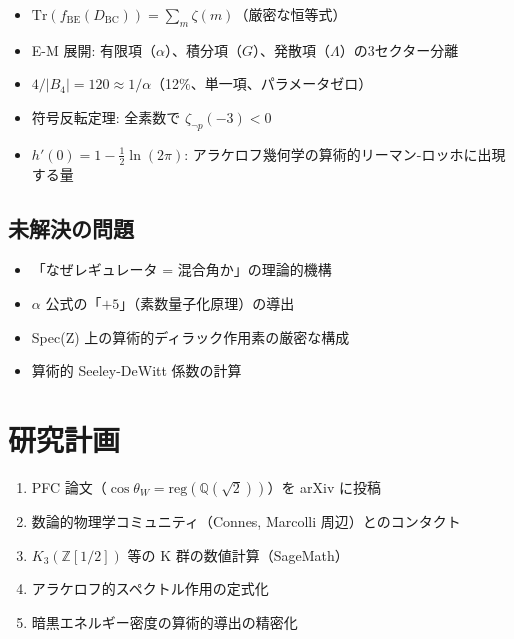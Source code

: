 \documentclass[11pt,a4paper]{article}
\begin{document}
\begin{resultbox}[確立された数学]
\begin{itemize}
\item $\mathrm{Tr}(f_{\mathrm{BE}}(D_{\mathrm{BC}})) = \sum_m \zeta(m)$（厳密な恒等式）
\item E-M 展開: 有限項（$\alpha$）、積分項（$G$）、発散項（$\Lambda$）の3セクター分離
\item $4/|B_4| = 120 \approx 1/\alpha$（12\%、単一項、パラメータゼロ）
\item 符号反転定理: 全素数で $\zeta_{\neg p}(-3) < 0$
\item $h'(0) = 1 - \frac{1}{2}\ln(2\pi)$: アラケロフ幾何学の算術的リーマン-ロッホに出現する量
\end{itemize}
\end{resultbox}

\subsection{未解決の問題}

\begin{honestbox}[開かれた問い]
\begin{itemize}
\item 「なぜレギュレータ = 混合角か」の理論的機構
\item $\alpha$ 公式の「$+5$」（素数量子化原理）の導出
\item Spec(Z) 上の算術的ディラック作用素の厳密な構成
\item 算術的 Seeley-DeWitt 係数の計算
\end{itemize}
\end{honestbox}

\section{研究計画}

\begin{enumerate}
\item PFC 論文（$\cos\theta_W = \mathrm{reg}(\mathbb{Q}(\sqrt{2}))$）を arXiv に投稿
\item 数論的物理学コミュニティ（Connes, Marcolli 周辺）とのコンタクト
\item $K_3(\mathbb{Z}[1/2])$ 等の K 群の数値計算（SageMath）
\item アラケロフ的スペクトル作用の定式化
\item 暗黒エネルギー密度の算術的導出の精密化
\end{enumerate}
\end{document}
